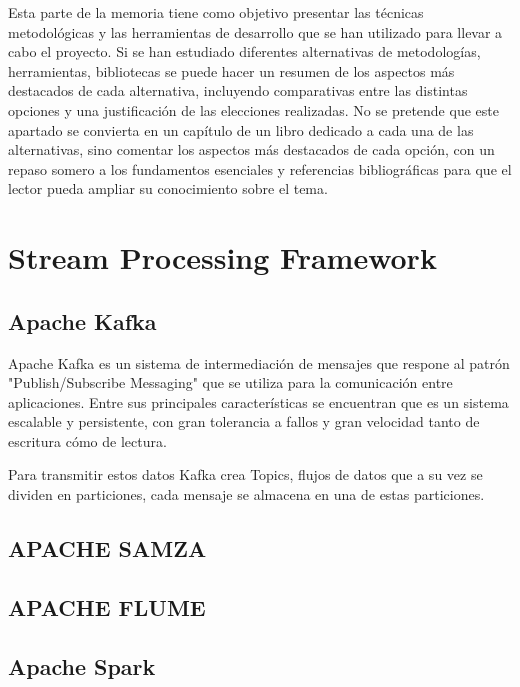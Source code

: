 
Esta parte de la memoria tiene como objetivo presentar las técnicas metodológicas y las herramientas de desarrollo que se han utilizado para llevar a cabo el proyecto. Si se han estudiado diferentes alternativas de metodologías, herramientas, bibliotecas se puede hacer un resumen de los aspectos más destacados de cada alternativa, incluyendo comparativas entre las distintas opciones y una justificación de las elecciones realizadas. 
No se pretende que este apartado se convierta en un capítulo de un libro dedicado a cada una de las alternativas, sino comentar los aspectos más destacados de cada opción, con un repaso somero a los fundamentos esenciales y referencias bibliográficas para que el lector pueda ampliar su conocimiento sobre el tema.


\section{Stream Processing Framework}

\subsection{Apache Kafka}

Apache Kafka es un sistema de intermediación de mensajes que respone al patrón "Publish/Subscribe Messaging" que se utiliza para la comunicación entre aplicaciones. Entre sus principales características se encuentran que es un sistema escalable y persistente, con gran tolerancia a fallos y gran velocidad tanto de escritura cómo de lectura.

Para transmitir estos datos Kafka crea Topics, flujos de datos que a su vez se dividen en particiones, cada mensaje se almacena en una de estas particiones.

\subsection{APACHE SAMZA}


\subsection{APACHE FLUME}


\subsection{Apache Spark}


